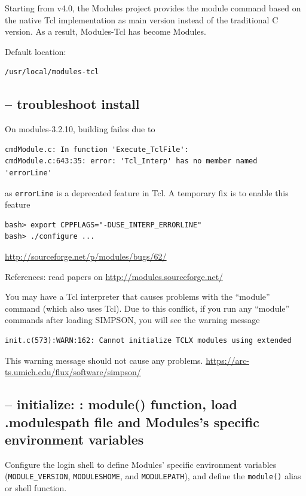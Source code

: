 Starting from v4.0, the Modules project provides the module command based on the
native Tcl implementation as main version instead of the traditional C version.
As a result, Modules-Tcl has become Modules. 
 

Default location:
\begin{verbatim}
/usr/local/modules-tcl
\end{verbatim}

\subsection{-- troubleshoot install}

\begin{mdframed}
On modules-3.2.10, building failes due to
\begin{verbatim}
cmdModule.c: In function 'Execute_TclFile':
cmdModule.c:643:35: error: 'Tcl_Interp' has no member named 'errorLine'
\end{verbatim}
as \verb!errorLine! is a deprecated feature in Tcl. A temporary fix is to enable
this feature
\begin{verbatim}
bash> export CPPFLAGS="-DUSE_INTERP_ERRORLINE"
bash> ./configure ... 
\end{verbatim}
\url{http://sourceforge.net/p/modules/bugs/62/}

References: read papers on \url{http://modules.sourceforge.net/}
\end{mdframed}


You may have a Tcl interpreter that causes problems with the “module” command
(which also uses Tcl). Due to this conflict, if you run any “module” commands
after loading SIMPSON, you will see the warning message
 
\begin{verbatim}
init.c(573):WARN:162: Cannot initialize TCLX modules using extended
\end{verbatim}
This warning message should not cause any problems.
\url{https://arc-ts.umich.edu/flux/software/simpson/}

\subsection{-- initialize: : module() function, load .modulespath
file and Modules's specific environment variables}
\label{sec:Modules-init}
\label{sec:.modulespath}
\label{sec:Module-environment-variables}
\label{sec:MODULEPATH}

Configure the login shell to define Modules' specific environment
variables (\verb!MODULE_VERSION!, \verb!MODULESHOME!, and \verb!MODULEPATH!),
and define the \verb!module()! alias or shell function. 

